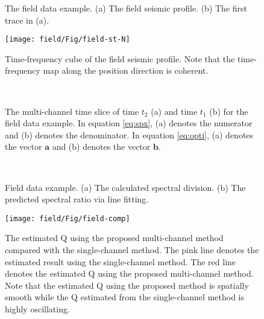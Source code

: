 \begin{figure}[htb!]
	\centering
	\caption{The field data example. (a) The field seismic profile. (b) The first trace in (a).}
	\label{fig:field-0,field-single}
\end{figure}

\begin{figure}[htb!]
	\centering
	\texttt{[image: field/Fig/field-st-N]}
	\caption{Time-frequency cube of the field seismic profile. Note that the time-frequency map along the position direction is coherent. }
	\label{fig:field-st-N}
\end{figure}


\begin{figure}[htb!]
	\centering
	\\
	\caption{The multi-channel time slice of time $t_2$ (a) and time $t_1$ (b) for the field data example. In equation \ref{eq:spx}, (a) denotes the numerator and (b) denotes the denominator. In equation \ref{eq:opti}, (a) denotes the vector $\mathbf{a}$ and (b) denotes the vector $\mathbf{b}$.}
	\label{fig:field-f-t2-N,field-f-t1-N}
\end{figure}


\begin{figure}[htb!]
	\centering
	\\
	\caption{Field data example. (a) The calculated spectral division. (b) The predicted spectral ratio via line fitting.}
	\label{fig:field-ratio-N,field-lsfits}
\end{figure}


\begin{figure}[htb!]
	\centering
	\texttt{[image: field/Fig/field-comp]}
	\caption{The estimated Q using the proposed multi-channel method compared with the single-channel method. The pink line denotes the estimated result using the single-channel method.  The red line denotes the estimated Q using the proposed multi-channel method. Note that the estimated Q using the proposed method is spatially smooth while the Q estimated from the single-channel method is highly oscillating. }
	\label{fig:field-comp}
\end{figure}




